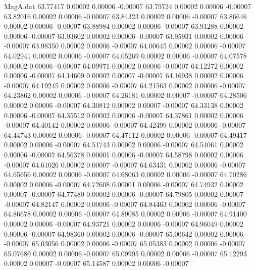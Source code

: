 \begin{filecontents}{MagA.dat}
  63.77417    0.00002    0.00006   -0.00007
  63.79724    0.00002    0.00006   -0.00007
  63.82016    0.00002    0.00006   -0.00007
  63.84323    0.00002    0.00006   -0.00007
  63.86646    0.00002    0.00006   -0.00007
  63.88984    0.00002    0.00006   -0.00007
  63.91288    0.00002    0.00006   -0.00007
  63.93602    0.00002    0.00006   -0.00007
  63.95931    0.00002    0.00006   -0.00007
  63.98350    0.00002    0.00006   -0.00007
  64.00645    0.00002    0.00006   -0.00007
  64.02941    0.00002    0.00006   -0.00007
  64.05269    0.00002    0.00006   -0.00007
  64.07578    0.00002    0.00006   -0.00007
  64.09971    0.00002    0.00006   -0.00007
  64.12272    0.00002    0.00006   -0.00007
  64.14609    0.00002    0.00007   -0.00007
  64.16938    0.00002    0.00006   -0.00007
  64.19245    0.00002    0.00006   -0.00007
  64.21563    0.00002    0.00006   -0.00007
  64.23862    0.00002    0.00006   -0.00007
  64.26181    0.00002    0.00007   -0.00007
  64.28506    0.00002    0.00006   -0.00007
  64.30812    0.00002    0.00007   -0.00007
  64.33138    0.00002    0.00006   -0.00007
  64.35512    0.00002    0.00006   -0.00007
  64.37861    0.00002    0.00006   -0.00007
  64.40142    0.00002    0.00006   -0.00007
  64.42499    0.00002    0.00006   -0.00007
  64.44743    0.00002    0.00006   -0.00007
  64.47112    0.00002    0.00006   -0.00007
  64.49417    0.00002    0.00006   -0.00007
  64.51743    0.00002    0.00006   -0.00007
  64.54061    0.00002    0.00006   -0.00007
  64.56378    0.00001    0.00006   -0.00007
  64.58798    0.00002    0.00006   -0.00007
  64.61026    0.00002    0.00007   -0.00007
  64.63431    0.00002    0.00006   -0.00007
  64.65656    0.00002    0.00006   -0.00007
  64.68063    0.00002    0.00006   -0.00007
  64.70286    0.00002    0.00006   -0.00007
  64.72608    0.00001    0.00006   -0.00007
  64.74932    0.00002    0.00007   -0.00007
  64.77480    0.00002    0.00006   -0.00007
  64.79805    0.00002    0.00007   -0.00007
  64.82147    0.00002    0.00006   -0.00007
  64.84463    0.00002    0.00006   -0.00007
  64.86678    0.00002    0.00006   -0.00007
  64.89085    0.00002    0.00006   -0.00007
  64.91400    0.00002    0.00006   -0.00007
  64.93721    0.00002    0.00006   -0.00007
  64.96049    0.00002    0.00006   -0.00007
  64.98360    0.00002    0.00006   -0.00007
  65.00642    0.00002    0.00006   -0.00007
  65.03056    0.00002    0.00006   -0.00007
  65.05383    0.00002    0.00006   -0.00007
  65.07680    0.00002    0.00006   -0.00007
  65.09995    0.00002    0.00006   -0.00007
  65.12293    0.00002    0.00007   -0.00007
  65.14587    0.00002    0.00006   -0.00007

\end{filecontents}
